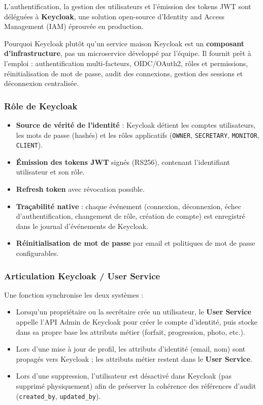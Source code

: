 \documentclass[12pt,a4paper]{article}
\newcommand{\highlight}[1]{\textbf{\color{primary}#1}}
\newcommand{\role}[1]{\textbf{\color{accent}#1}}
\begin{document}
L'authentification, la gestion des utilisateurs et l'émission des tokens JWT sont déléguées à \highlight{Keycloak}, une solution open-source d'Identity and Access Management (IAM) éprouvée en production.

\begin{infobox}{Pourquoi Keycloak plutôt qu'un service maison}
Keycloak est un \textbf{composant d'infrastructure}, pas un microservice développé par l'équipe. Il fournit prêt à l'emploi : authentification multi-facteurs, OIDC/OAuth2, rôles et permissions, réinitialisation de mot de passe, audit des connexions, gestion des sessions et déconnexion centralisée.
\end{infobox}

\subsubsection{Rôle de Keycloak}

\begin{itemize}[leftmargin=*,itemsep=4pt]
    \item \textbf{Source de vérité de l'identité} : Keycloak détient les comptes utilisateurs, les mots de passe (hashés) et les rôles applicatifs (\texttt{OWNER}, \texttt{SECRETARY}, \texttt{MONITOR}, \texttt{CLIENT}).
    \item \textbf{Émission des tokens JWT} signés (RS256), contenant l'identifiant utilisateur et son rôle.
    \item \textbf{Refresh token} avec révocation possible.
    \item \textbf{Traçabilité native} : chaque événement (connexion, déconnexion, échec d'authentification, changement de rôle, création de compte) est enregistré dans le journal d'événements de Keycloak.
    \item \textbf{Réinitialisation de mot de passe} par email et politiques de mot de passe configurables.
\end{itemize}

\subsubsection{Articulation Keycloak / User Service}

Une fonction synchronise les deux systèmes :

\begin{itemize}[leftmargin=*,itemsep=4pt]
    \item Lorsqu'un propriétaire ou la secrétaire crée un utilisateur, le \role{User Service} appelle l'API Admin de Keycloak pour créer le compte d'identité, puis stocke dans sa propre base les attributs métier (forfait, progression, photo, etc.).
    \item Lors d'une mise à jour de profil, les attributs d'identité (email, nom) sont propagés vers Keycloak ; les attributs métier restent dans le \role{User Service}.
    \item Lors d'une suppression, l'utilisateur est désactivé dans Keycloak (pas supprimé physiquement) afin de préserver la cohérence des références d'audit (\texttt{created\_by}, \texttt{updated\_by}).
\end{itemize}
\end{document}
